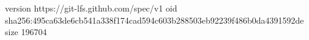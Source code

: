 version https://git-lfs.github.com/spec/v1
oid sha256:495ca63de6cb541a338f174cad594c603b288503eb92239f486b0da4391592de
size 196704
